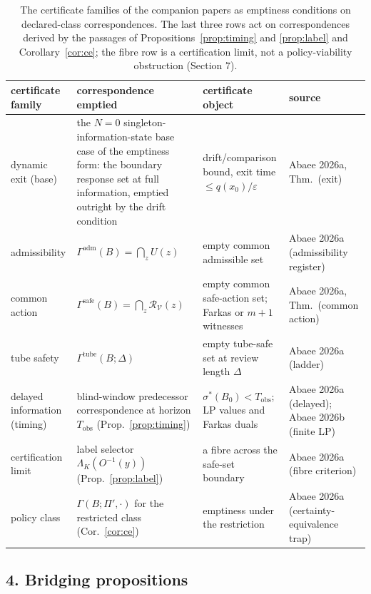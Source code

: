 \documentclass[10pt,twocolumn]{article}
\theoremstyle{definition}
\begin{document}
\begin{table}[t]
\centering
\footnotesize
\begin{tabular}{@{}>{\raggedright\arraybackslash}p{24mm}|>{\raggedright\arraybackslash}p{50mm}|>{\raggedright\arraybackslash}p{46mm}|>{\raggedright\arraybackslash}p{38mm}@{}}
\toprule
certificate family & correspondence emptied & certificate object & source \\
\midrule
dynamic exit (base) & the \(N = 0\) singleton-information-state base
case of the emptiness form: the boundary response set at full information,
emptied outright by the drift condition & drift/comparison bound, exit time \(\le q(x_0)/\varepsilon\) & Abaee 2026a, Thm.\ (exit) \\
admissibility & \(\Gamma^{\mathrm{adm}}(B) = \bigcap_{z} U(z)\) &
empty common admissible set & Abaee 2026a (admissibility register) \\
common action & \(\Gamma^{\mathrm{safe}}(B) = \bigcap_{z}
\mathcal{R}_{\mathcal{V}}(z)\) & empty common safe-action set; Farkas or
\(m{+}1\) witnesses & Abaee 2026a, Thm.\ (common action) \\
tube safety & \(\Gamma^{\mathrm{tube}}(B;\Delta)\) &
empty tube-safe set at review length \(\Delta\) & Abaee 2026a (ladder) \\
delayed information (timing) & blind-window predecessor correspondence at
horizon \(T_{\mathrm{obs}}\) (Prop.~\ref{prop:timing}) &
\(\sigma^{*}(B_0) < T_{\mathrm{obs}}\); LP values and Farkas duals &
Abaee 2026a (delayed); Abaee 2026b (finite LP) \\
certification limit & label selector \(\Lambda_{K}(O^{-1}(y))\)
(Prop.~\ref{prop:label}) & a fibre across the safe-set boundary &
Abaee 2026a (fibre criterion) \\
policy class & \(\Gamma(B; \Pi', \cdot)\) for the restricted class
(Cor.~\ref{cor:ce}) & emptiness under the restriction &
Abaee 2026a (certainty-equivalence trap) \\
\bottomrule
\end{tabular}
\caption{The certificate families of the companion papers as emptiness
conditions on declared-class correspondences. The last three rows act on
correspondences derived by the passages of Propositions~\ref{prop:timing}
and \ref{prop:label} and Corollary~\ref{cor:ce}; the fibre row is a
certification limit, not a policy-viability obstruction
(Section 7).}
\label{tab:families}
\end{table}

\subsection{4. Bridging propositions}\label{bridges}
\end{document}
